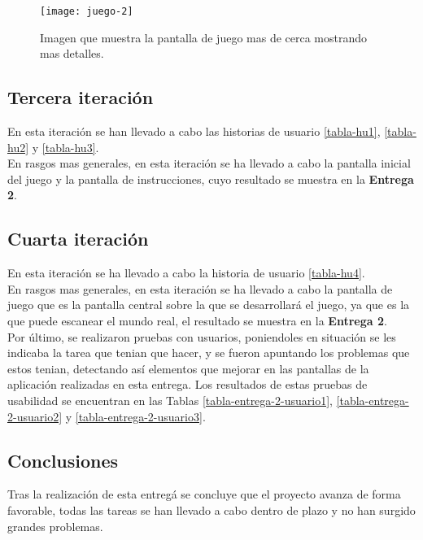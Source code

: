 \begin{itemize}
\begin{figure}[h]
  \centering
  \texttt{[image: juego-2]}
  \caption{Imagen que muestra la pantalla de juego mas de cerca mostrando mas detalles.}
  \label{figura-juego-2}
\end{figure}

\FloatBarrier


\subsection{Tercera iteración}
En esta iteración se han llevado a cabo las historias de usuario \ref{tabla-hu1}, \ref{tabla-hu2} y \ref{tabla-hu3}.\\

En rasgos mas generales, en esta iteración se ha llevado a cabo la pantalla inicial del juego y la pantalla de instrucciones, cuyo resultado se muestra en la \textbf{Entrega 2}.


\subsection{Cuarta iteración}
En esta iteración se ha llevado a cabo la historia de usuario \ref{tabla-hu4}.\\

En rasgos mas generales, en esta iteración se ha llevado a cabo la pantalla de juego que es la pantalla central sobre la que se desarrollará el juego, ya que es la que puede escanear el mundo real, el resultado se muestra en la \textbf{Entrega 2}.\\

Por último, se realizaron pruebas con usuarios, poniendoles en situación se les indicaba la tarea que tenian que hacer, y se fueron apuntando los problemas que estos tenian, detectando así elementos que mejorar en las pantallas de la aplicación realizadas en esta entrega. Los resultados de estas pruebas de usabilidad se encuentran en las Tablas \ref{tabla-entrega-2-usuario1}, \ref{tabla-entrega-2-usuario2} y \ref{tabla-entrega-2-usuario3}.

\subsection{Conclusiones}
Tras la realización de esta entregá se concluye que el proyecto avanza de forma favorable, todas las tareas se han llevado a cabo dentro de plazo y no han surgido grandes problemas.\\


\end{itemize}
